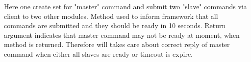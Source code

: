 Here one create set for "master" command and submit two "slave" commands via client
to two other modules. Method  used to inform framework
that all commands are submitted and they should be ready in 10 seconds. Return argument
 indicates that master command may not be ready at moment, when method is returned.
Therefore  will takes care about correct reply of master command when
either all slaves are ready or timeout is expire.







